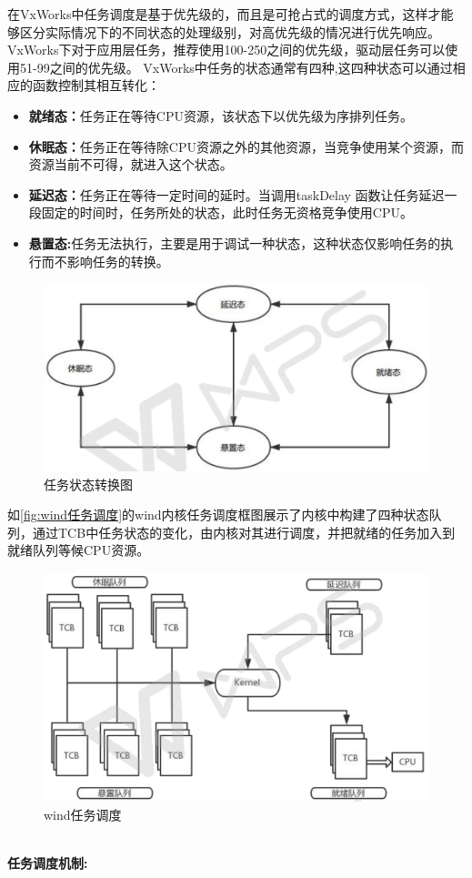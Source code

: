 	在VxWorks中任务调度是基于优先级的，而且是可抢占式的调度方式，这样才能够区分实际情况下的不同状态的处理级别，对高优先级的情况进行优先响应。	VxWorks下对于应用层任务，推荐使用100-250之间的优先级，驱动层任务可以使用51-99之间的优先级。
	VxWorks中任务的状态通常有四种,这四种状态可以通过相应的函数控制其相互转化：
\begin{itemize}
\item \textbf{就绪态：}任务正在等待CPU资源，该状态下以优先级为序排列任务。
\item \textbf{休眠态：}任务正在等待除CPU资源之外的其他资源，当竞争使用某个资源，而资源当前不可得，就进入这个状态。
\item \textbf{延迟态：}任务正在等待一定时间的延时。当调用taskDelay 函数让任务延迟一段固定的时间时，任务所处的状态，此时任务无资格竞争使用CPU。
\item \textbf{悬置态:}任务无法执行，主要是用于调试一种状态，这种状态仅影响任务的执行而不影响任务的转换。
\end{itemize}

\begin{figure}[!h]
\centering
\includegraphics[width=.9\textwidth]{./graphics/vxworks-task-shift-diagram.pdf}
\caption{任务状态转换图}\label{fig:VxWorks状态转换图}
\end{figure}

	如\autoref{fig:wind任务调度}的wind内核任务调度框图展示了内核中构建了四种状态队列，通过TCB中任务状态的变化，由内核对其进行调度，并把就绪的任务加入到就绪队列等候CPU资源。
\begin{figure}[!h]
\centering
\includegraphics[width=.9\textwidth]{./graphics/vxworks-task-scheduling-diagram.pdf}
\caption{wind任务调度}\label{fig:wind任务调度}
\end{figure}\\
\textbf{任务调度机制:}


